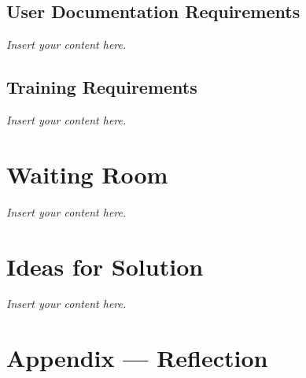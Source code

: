 \documentclass[12pt]{article}
\newcommand{\lips}{\textit{Insert your content here.}}
\begin{document}
\subsection{User Documentation Requirements}
\lips
\subsection{Training Requirements}
\lips

\section{Waiting Room}
\lips

\section{Ideas for Solution}
\lips

\newpage{}
\section*{Appendix --- Reflection}




\end{document}
